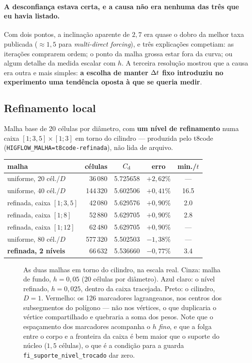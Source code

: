 \paragraph{A desconfiança estava certa, e a causa não era nenhuma das três
que eu havia listado.} Com dois pontos, a inclinação aparente de $2{,}7$ era
quase o dobro da melhor taxa publicada ($\approx 1{,}5$ para \emph{multi-direct
forcing}), e três explicações competiam: as iterações comprarem ordem; o ponto da
malha grossa estar fora da curva; ou algum detalhe da medida escalar com $h$. A
terceira resolução mostrou que a causa era outra e mais simples: \textbf{a
escolha de manter $\Delta t$ fixo introduziu no experimento uma tendência oposta à que
se queria medir}.

\subsection{Refinamento local}

Malha base de 20 células por diâmetro, com \textbf{um nível de refinamento} numa
caixa $[1;3{,}5]\times[1;3]$ em torno do cilindro --- produzida pelo t8code
(\texttt{HIGFLOW\_MALHA=t8code-refinada}), não lida de arquivo.

\begin{center}
\begin{tabular}{lrSSS}
  \toprule
  malha & {células} & {$C_{\mathrm{d}}$} & {erro} & {min./$t$} \\
  \midrule
  uniforme, 20 cél./$D$ &  36\,080 & 5.725658 & {$+2{,}62\%$} & {---} \\
  uniforme, 40 cél./$D$ & 144\,320 & 5.602506 & {$+0{,}41\%$} & 16.5 \\
  refinada, caixa $[1;3{,}5]$ &  42\,080 & 5.629576 & {$+0{,}90\%$} & 2.0 \\
  refinada, caixa $[1;8]$      &  52\,880 & 5.629705 & {$+0{,}90\%$} & 2.8 \\
  refinada, caixa $[1;12]$     &  62\,480 & 5.629705 & {$+0{,}90\%$} & --- \\
  \midrule
  uniforme, 80 cél./$D$        & 577\,320 & 5.502503 & {$-1{,}38\%$} & --- \\
  \textbf{refinada, 2 níveis}  &  66\,632 & 5.536660 & {$-0{,}77\%$} & 3.4 \\
  \bottomrule
\end{tabular}
\end{center}

\begin{figure}[htbp]
\centering

\caption{As duas malhas em torno do cilindro, na escala real. Cinza: malha de
fundo, $h=0{,}05$ (20 células por diâmetro). Azul claro: o nível refinado,
$h=0{,}025$, dentro da caixa tracejada. Preto: o cilindro, $D=1$. Vermelho: os
126 marcadores lagrangeanos, nos centros dos subsegmentos do polígono --- não
nos vértices, o que duplicaria o vértice compartilhado e quebraria a soma dos
pesos. Note que o espaçamento dos marcadores acompanha o $h$ \emph{fino}, e que
a folga entre o corpo e a fronteira da caixa é bem maior que o suporte do núcleo
($1{,}5$ células), o que é a condição para a guarda
\texttt{fi\_suporte\_nivel\_trocado} dar zero.}
\label{fig:malha-zoom}
\end{figure}

